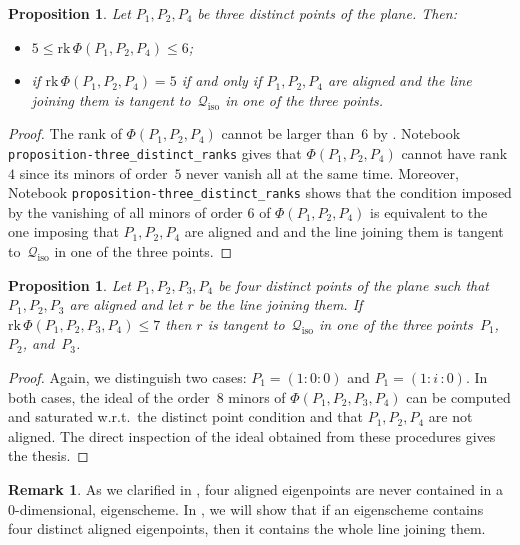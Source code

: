 \documentclass[a4paper, 11pt, reqno]{amsart}
\theoremstyle{plain}
\newtheorem{prop}[lemma]{Proposition}
\theoremstyle{definition}
\newtheorem{rmk}[lemma]{Remark}
\newcommand{\iii}{\textit{i}\,}
\newcommand{\rk}{\ensuremath{\mathrm{rk}}}
\newcommand{\iso}{\mathcal{Q}_{\mathrm{iso}}}
\begin{document}
\begin{prop}
\label{proposition:three_distinct_ranks}
Let $P_1, P_2, P_4$ be three distinct points of the plane. Then:
%
\begin{itemize}
  \item $5 \leq \rk \,\Phi(P_1, P_2, P_4) \leq 6$;
  \item if
  $\rk \, \Phi(P_1, P_2, P_4) = 5$ if and only if $P_1, P_2, P_4$
  are aligned and the line joining them is tangent to~$\iso$
  in one of the three points.
\end{itemize}
%
\end{prop}
\begin{proof}
The rank of $\Phi(P_1, P_2, P_4)$ cannot be larger than~$6$ by .
Notebook \texttt{proposition-three\_distinct\_ranks} gives that $\Phi(P_1, P_2, P_4)$ cannot have rank $4$ since its minors of order~$5$ never vanish all at the same time. Moreover, Notebook \texttt{proposition-three\_distinct\_ranks} shows that the condition imposed by the vanishing of all minors of order $6$ of $\Phi(P_1, P_2, P_4)$ is equivalent to the one imposing that $P_1, P_2, P_4$ are aligned and and the line joining them is tangent to~$\iso$  in one of the three points.
\end{proof}

\begin{prop}
\label{prop:condition3+1}
Let $P_1, P_2, P_3, P_4$ be four distinct points of the plane such that
$P_1, P_2, P_3$ are aligned and let $r$ be the line joining them.
If $\rk \,\Phi(P_1, P_2, P_3, P_4) \leq 7$ then $r$ is tangent to~$\iso$ in one of the three points~$P_1$,  $P_2$, and~$P_3$.
\end{prop}
\begin{proof}
Again, we distinguish two cases: $P_1 = (1: 0: 0)$ and
$P_1 = (1: \iii: 0)$. In both cases, the ideal of the order~$8$
minors of $\Phi(P_1, P_2, P_3, P_4)$ can be computed and saturated
w.r.t.\ the distinct point condition and that
$P_1, P_2, P_4$ are not aligned.
The direct inspection of the ideal obtained from these procedures gives the thesis.
\end{proof}

\begin{rmk}
As we clarified in , four aligned eigenpoints are never contained in a $0$-dimensional, eigenscheme.
In , we will show that if an eigenscheme contains four distinct aligned eigenpoints, then it contains the whole line joining them.
\end{rmk}
\end{document}
